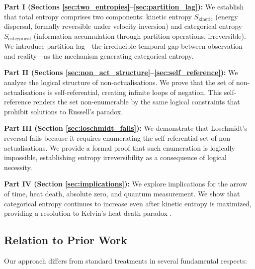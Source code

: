 \documentclass[twocolumn,10pt]{article}
\theoremstyle{definition}
\theoremstyle{remark}
\begin{document}
\textbf{Part I (Sections \ref{sec:two_entropies}--\ref{sec:partition_lag}):} We establish that total entropy comprises two components: kinetic entropy $S_{\text{kinetic}}$ (energy dispersal, formally reversible under velocity inversion) and categorical entropy $S_{\text{categorical}}$ (information accumulation through partition operations, irreversible). We introduce partition lag—the irreducible temporal gap between observation and reality—as the mechanism generating categorical entropy.

\textbf{Part II (Sections \ref{sec:non_act_structure}--\ref{sec:self_reference}):} We analyze the logical structure of non-actualisations. We prove that the set of non-actualisations is self-referential, creating infinite loops of negation. This self-reference renders the set non-enumerable by the same logical constraints that prohibit solutions to Russell's paradox.

\textbf{Part III (Section \ref{sec:loschmidt_fails}):} We demonstrate that Loschmidt's reversal fails because it requires enumerating the self-referential set of non-actualisations. We provide a formal proof that such enumeration is logically impossible, establishing entropy irreversibility as a consequence of logical necessity.

\textbf{Part IV (Section \ref{sec:implications}):} We explore implications for the arrow of time, heat death, absolute zero, and quantum measurement. We show that categorical entropy continues to increase even after kinetic entropy is maximized, providing a resolution to Kelvin's heat death paradox \cite{sachikonye2025kelvin}.

\subsection{Relation to Prior Work}

Our approach differs from standard treatments in several fundamental respects:
\end{document}
